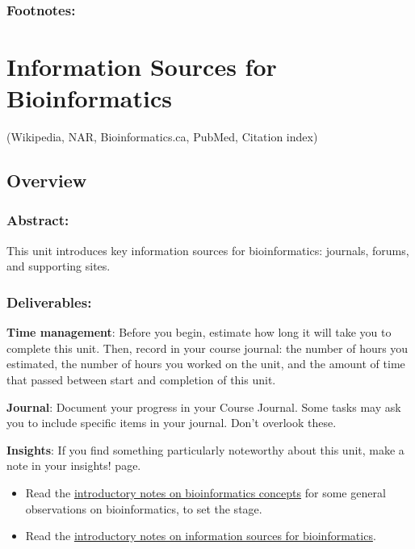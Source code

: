 \documentclass[]{book}
\providecommand{\tightlist}{%
  \setlength{\itemsep}{0pt}\setlength{\parskip}{0pt}}
\begin{document}
\subsection{Footnotes:}\label{footnotes-3}

\chapter{Information Sources for
Bioinformatics}\label{information-sources-for-bioinformatics}

(Wikipedia, NAR, Bioinformatics.ca, PubMed, Citation index)

\section{Overview}\label{overview-7}

\subsection{Abstract:}\label{abstract-7}

This unit introduces key information sources for bioinformatics:
journals, forums, and supporting sites.

\subsection{Deliverables:}\label{deliverables-7}

\textbf{Time management}: Before you begin, estimate how long it will
take you to complete this unit. Then, record in your course journal: the
number of hours you estimated, the number of hours you worked on the
unit, and the amount of time that passed between start and completion of
this unit.

\textbf{Journal}: Document your progress in your Course Journal. Some
tasks may ask you to include specific items in your journal. Don't
overlook these.

\textbf{Insights}: If you find something particularly noteworthy about
this unit, make a note in your insights! page.

\begin{rmd-task}
\begin{itemize}
\tightlist
\item
  Read the \href{boris_docs/FND-BIN-Concepts.pdf}{introductory notes on
  bioinformatics concepts} for some general observations on
  bioinformatics, to set the stage.
\item
  Read the \href{boris_docs/BIN-Info_sources.pdf}{introductory notes on
  information sources for bioinformatics}.
\end{itemize}
\end{rmd-task}
\end{document}
